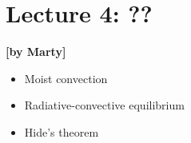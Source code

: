 
\section{Lecture 4: ??}\label{sec:lecture4}
\begin{flushright}\textbf{[by Marty]}\end{flushright}
  
 \begin{itemize}
   \item
   Moist convection
   \item
   Radiative-convective equilibrium
   \item
   Hide's theorem
\end{itemize}
